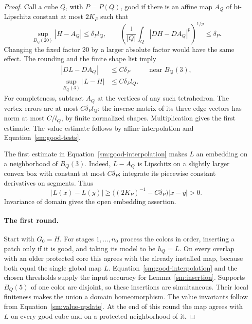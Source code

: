 \begin{proof}
Call a cube $Q$, with $P=P(Q)$, good if there is an affine
map $A_Q$ of bi-Lipschitz constant at most $2K_P$ such that
\begin{equation}
 \label{sm:good-tests}
 \sup_{B_Q(20)}|H-A_Q|\le\delta_P l_Q,
 \qquad
 \left(\frac{1}{|Q|}\int_Q|DH-DA_Q|^p\right)^{1/p}\le\delta_P.
\end{equation}
Changing the fixed factor 20 by a larger absolute factor
would have the same effect.  The rounding and the finite
shape list imply
\begin{equation}
 \label{sm:good-interpolation}
 \begin{aligned}
 |DL-DA_Q|&\le C\delta_P
 &&\text{near }B_Q(3),\\
 \sup_{B_Q(3)}|L-H|&\le C\delta_P l_Q.
 \end{aligned}
\end{equation}
For completeness, subtract $A_Q$ at the vertices of any
such tetrahedron.  The vertex errors are at most
$C\delta_P l_Q$; the inverse matrix of its three edge
vectors has norm at most $C/l_Q$, by finite normalized
shapes.  Multiplication gives the first estimate.
The value estimate follows by affine interpolation
and Equation~\eqref{sm:good-tests}.

The first estimate in Equation~\eqref{sm:good-interpolation} makes
$L$ an embedding on a neighborhood of $B_Q(3)$.
Indeed, $L-A_Q$ is Lipschitz on a slightly larger convex
box with constant at most $C\delta_P$; integrate its
piecewise constant derivatives on segments.  Thus
\[
 |L(x)-L(y)|\ge
 \bigl((2K_P)^{-1}-C\delta_P\bigr)|x-y|>0.
\]
Invariance of domain gives the open embedding assertion.

\paragraph{The first round.}
Start with $G_0=H$.  For stages $1,\ldots,n_0$ process the
colors in order, inserting a patch only if it is good,
and taking its model to be $h_Q=L$.  On every overlap
with an older protected core this agrees with the
already installed map, because both equal the single
global map $L$.  Equation~\eqref{sm:good-interpolation}
and the chosen thresholds supply the input accuracy
for Lemma~\ref{sm:insertion}.  Supports $B_Q(5)$ of one
color are disjoint, so these insertions are simultaneous.
Their local finiteness makes the union a domain
homeomorphism.  The value invariants follow from
Equation~\eqref{sm:value-update}.  At the end of this round the
map agrees with $L$ on every good cube and on a
protected neighborhood of it.


\end{proof}
